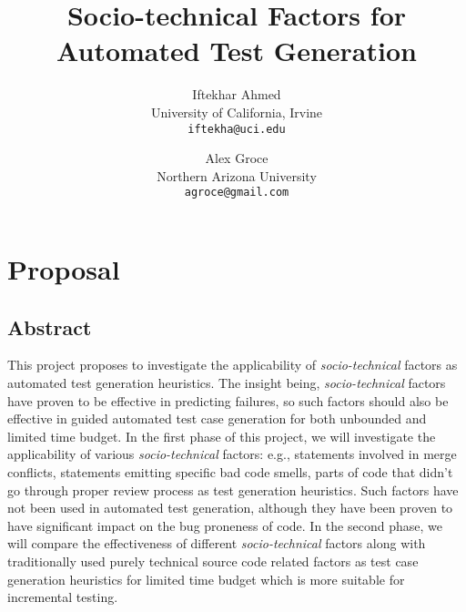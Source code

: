 \documentclass[10pt]{article}
\title{Socio-technical Factors for Automated Test Generation \vspace{-2ex}}
\author{
  Iftekhar Ahmed\\
  University of California, Irvine\\
  \texttt{iftekha@uci.edu} \vspace{-5ex}
  \and
  Alex Groce\\
  Northern Arizona University\\
  \texttt{agroce@gmail.com}\vspace{-5ex}
}
\date{}
\begin{document}
\maketitle

\section{Proposal}

\subsection{Abstract}

This project proposes to investigate the applicability of \emph{socio-technical} factors as automated test generation heuristics. The  insight being, \emph{socio-technical} factors have proven to be effective in predicting failures, so such factors should also be effective in guided automated test case generation for both unbounded and limited time budget. In the first phase of this project, we will investigate the applicability of various \emph{socio-technical} factors: e.g., statements involved in merge conflicts, statements emitting specific bad code smells, parts of code that didn't go through proper review process as test generation heuristics. Such factors have not been used in automated test generation, although they have been proven to have significant impact on the bug proneness of code. In the second phase, we will compare the effectiveness of different \emph{socio-technical} factors along with traditionally used purely technical source code related factors as test case generation heuristics for limited time budget which is more suitable for incremental testing.
\end{document}

